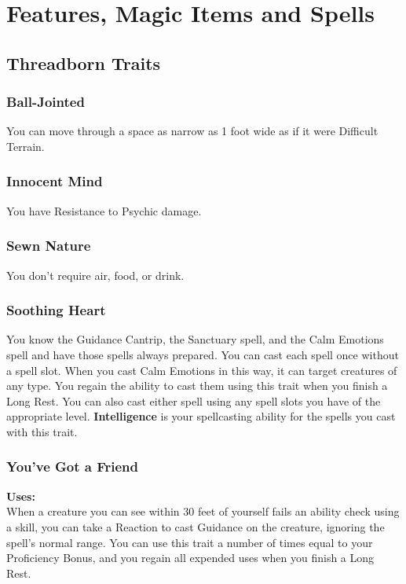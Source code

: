 \documentclass[letterpaper,openany,oneside,twocolumn]{book}
\begin{document}
\restoregeometry
\twocolumn

\chapter*{Features, Magic Items and Spells}

\section*{Threadborn Traits}
\subsection*{Ball-Jointed}
You can move through a space as narrow as 1 foot wide as if it were Difficult Terrain.

\subsection*{Innocent Mind}
You have Resistance to Psychic damage.

\subsection*{Sewn Nature}
You don't require air, food, or drink.

\subsection*{Soothing Heart}
You know the Guidance Cantrip, the Sanctuary spell, and the Calm Emotions spell and have those spells always prepared. You can cast each spell once without a spell slot. When you cast Calm Emotions in this way, it can target creatures of any type. You regain the ability to cast them using this trait when you finish a Long Rest. You can also cast either spell using any spell slots you have of the appropriate level. \textbf{Intelligence} is your spellcasting ability for the spells you cast with this trait.

\subsection*{You've Got a Friend}
\textbf{Uses: }\\
When a creature you can see within 30 feet of yourself fails an ability check using a skill, you can take a Reaction to cast Guidance on the creature, ignoring the spell's normal range. You can use this trait a number of times equal to your Proficiency Bonus, and you regain all expended uses when you finish a Long Rest.
\end{document}
